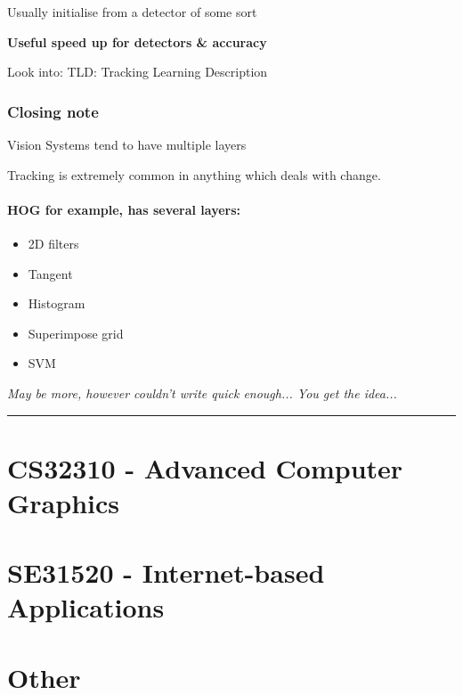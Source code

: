 \documentclass[paper=a4, fontsize=11pt]{article} %
\numberwithin{equation}{section} %
\numberwithin{figure}{section} %
\numberwithin{table}{section} %
\begin{document}
Usually initialise from a detector of some sort

\textbf{Useful speed up for detectors \& accuracy}

Look into: TLD: Tracking Learning Description

\subsubsection{Closing note}

Vision Systems tend to have multiple layers

Tracking is extremely common in anything which deals with change.

\paragraph{HOG for example, has several layers:}
\begin{itemize}
\item 2D filters
\item Tangent
\item Histogram
\item Superimpose grid
\item SVM
\end{itemize}
\textit{May be more, however couldn't write quick enough... You get the idea...}

\rule{\textwidth}{1pt}


\section{CS32310 - Advanced Computer Graphics}


\section{SE31520 - Internet-based Applications}



\section{Other}

\end{document}
